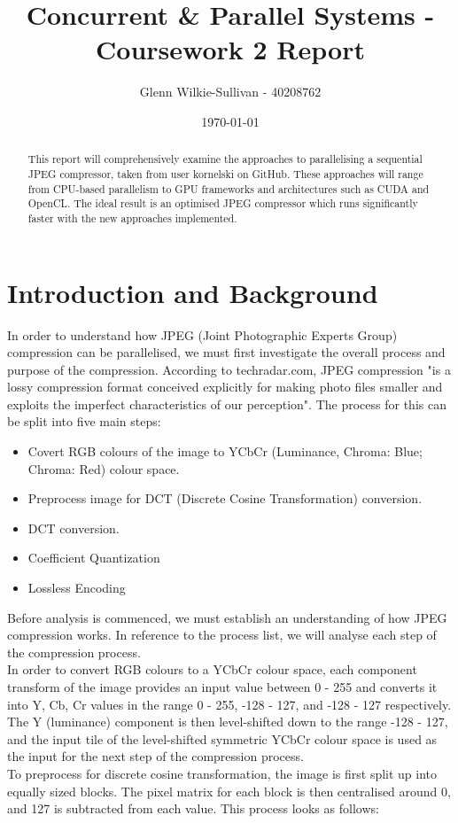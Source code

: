 \documentclass[12pt, a4paper]{article}
\title{\vspace{-3cm}Concurrent \& Parallel Systems - Coursework 2 Report}
\author{Glenn Wilkie-Sullivan - 40208762}
\date{\today}
\begin{document}
\maketitle

\begin{abstract}
\noindent This report will comprehensively examine the approaches to parallelising a sequential JPEG compressor, taken from user kornelski on GitHub. These approaches will range from CPU-based parallelism to GPU frameworks and architectures such as CUDA and OpenCL. The ideal result is an optimised JPEG compressor which runs significantly faster with the new approaches implemented.
\end{abstract}

\section{Introduction and Background}
In order to understand how JPEG (Joint Photographic Experts Group) compression can be parallelised, we must first investigate the overall process and purpose of the compression. According to techradar.com,  JPEG compression "is a lossy compression format conceived explicitly for making photo files smaller and exploits the imperfect characteristics of our perception". The process for this can be split into five main steps: 

\begin{itemize}
\item Covert RGB colours of the image to YCbCr (Luminance, Chroma: Blue; Chroma: Red) colour space.
\item Preprocess image for DCT (Discrete Cosine Transformation) conversion.
\item DCT conversion.
\item Coefficient Quantization
\item Lossless Encoding \\
\end{itemize}

Before analysis is commenced, we must establish an understanding of how JPEG compression works. In reference to the process list, we will analyse each step of the compression process. \\
In order to convert RGB colours to a YCbCr colour space, each component transform of the image provides an input value between 0 - 255 and converts it into Y, Cb, Cr values in the range 0 - 255, -128 - 127, and -128 - 127 respectively. The Y (luminance) component is then level-shifted down to the range -128 - 127, and the input tile of the level-shifted symmetric YCbCr colour space is used as the input for the next step of the compression process. \\
To preprocess for discrete cosine transformation, the image is first split up into equally sized blocks. The pixel matrix for each block is then centralised around 0, and 127 is subtracted from each value. This process looks as follows: \\
\end{document}
